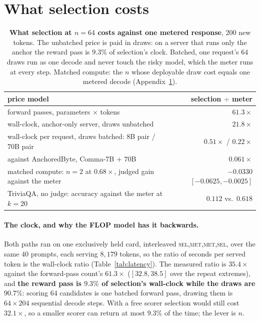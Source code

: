 \section{What selection costs}\label{app:sel-cost}

\begin{table}[ht]
\centering\footnotesize
\caption{\textbf{What selection at $n=64$ costs against one metered response}, $200$ new tokens. The
unbatched price is paid in draws: on a server that runs only the anchor the reward pass is $9.3\%$ of
selection's clock. Batched, one request's $64$ draws run as one decode and never touch the risky model,
which the meter runs at every step. Matched compute: the $n$ whose deployable draw cost equals one
metered decode (Appendix~\ref{app:sel-cost}).}
\label{tab:cost}
\setlength{\tabcolsep}{5pt}
\begin{tabular}{@{}lr@{}}
\toprule
price model & selection $\div$ meter \\
\midrule
forward passes, parameters $\times$ tokens & $61.3\times$ \\
wall-clock, anchor-only server, draws unbatched & $21.8\times$ \\
wall-clock per request, draws batched: $8$B pair / $70$B pair & $0.51\times$ / $0.22\times$ \\
\quad against AnchoredByte, Comma-7B $+$ $70$B & $0.061\times$ \\
\midrule
matched compute: $n=2$ at $0.68\times$, judged gain against the meter & $-0.0330$ $[-0.0625, -0.0025]$ \\
\quad TriviaQA, no judge: accuracy against the meter at $k=20$ & $0.112$ vs.\ $0.618$ \\
\bottomrule
\end{tabular}
\end{table}


\paragraph{The clock, and why the FLOP model has it backwards.}\label{app:latency}
Both paths ran on one exclusively held card, interleaved \textsc{sel},\textsc{met},\textsc{met},\textsc{sel},
over the same $40$ prompts, each serving $8{,}179$ tokens, so the ratio of seconds per served token is the
wall-clock ratio (Table~\ref{tab:latency}). The measured ratio is $35.4\times$ against the forward-pass
count's $61.3\times$ ($[32.8, 38.5]$ over the repeat extremes), and \textbf{the reward pass is $9.3\%$ of
selection's wall-clock while the draws are $90.7\%$}: scoring $64$ candidates is one batched forward pass,
drawing them is $64 \times 204$ sequential decode steps. With a free scorer selection would still cost
$32.1\times$, so a smaller scorer can return at most $9.3\%$ of the time; the lever is $n$.

